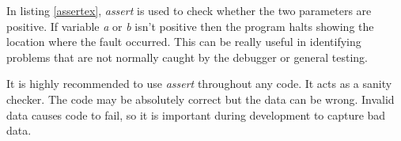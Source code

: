 In listing \ref{assertex}, \textit{assert} is used to check whether the two parameters are positive. If variable \textit{a} or \textit{b} isn't positive then the program halts showing the location where the fault occurred. This can be really useful in identifying problems that are not normally caught by the debugger or general testing. 

It is highly recommended to use \textit{assert} throughout any code. It acts as a sanity checker. The code may be absolutely correct but the data can be wrong. Invalid data causes code to fail, so it is important during development to capture bad data.

